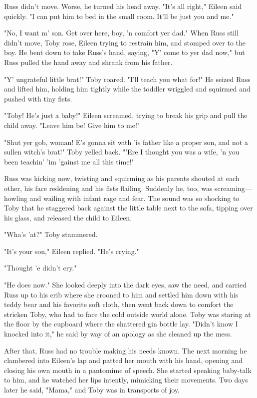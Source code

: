 Russ didn't move. Worse, he turned his head away. "It's all right," Eileen said quickly. "I can put him to bed in the small room. It'll be just you and me."

"No, I want m' son. Get over here, boy, 'n comfort yer dad." When Russ still didn't move, Toby rose, Eileen trying to restrain him, and stomped over to the boy. He bent down to take Russ's hand, saying, "Y' come to yer dad now," but Russ pulled the hand away and shrank from his father.

"Y' ungrateful little brat!" Toby roared. "I'll teach you what for!" He seized Russ and lifted him, holding him tightly while the toddler wriggled and squirmed and pushed with tiny fists.

"Toby! He's just a baby!" Eileen screamed, trying to break his grip and pull the child away. "Leave him be! Give him to me!"

"Shut yer gob, woman! E's gonna sit with 'is father like a proper son, and not a sullen witch's brat!" Toby yelled back. "'Ere I thought you was a wife, 'n you been teachin' 'im 'gainst me all this time!"

Russ was kicking now, twisting and squirming as his parents shouted at each other, his face reddening and his fists flailing. Suddenly he, too, was screaming—howling and wailing with infant rage and fear. The sound was so shocking to Toby that he staggered back against the little table next to the sofa, tipping over his glass, and released the child to Eileen.

"Wha's 'at?" Toby stammered.

"It's your son," Eileen replied. "He's crying."

"Thought 'e didn't cry."

"He does now." She looked deeply into the dark eyes, saw the need, and carried Russ up to his crib where she crooned to him and settled him down with his teddy bear and his favorite soft cloth, then went back down to comfort the stricken Toby, who had to face the cold outside world alone. Toby was staring at the floor by the cupboard where the shattered gin bottle lay. "Didn't know I knocked into it," he said by way of an apology as she cleaned up the mess.

After that, Russ had no trouble making his needs known. The next morning he clambered into Eileen's lap and patted her mouth with his hand, opening and closing his own mouth in a pantomime of speech. She started speaking baby-talk to him, and he watched her lips intently, mimicking their movements. Two days later he said, "Mama," and Toby was in transports of joy.

